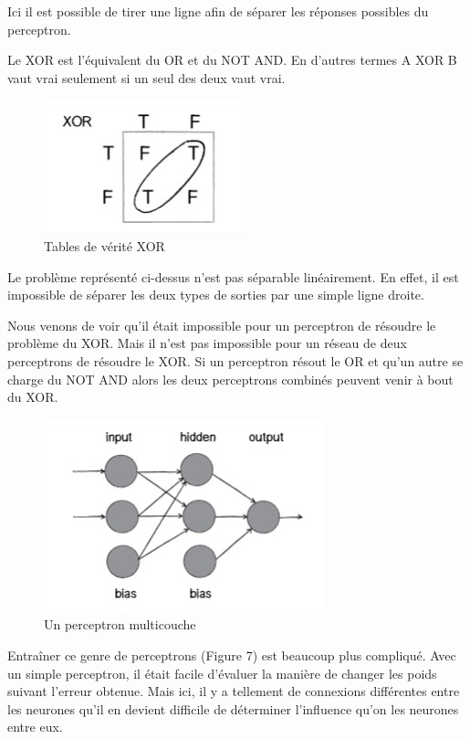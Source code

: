 \documentclass[a4paper, 12pt]{article} %
\begin{document}
Ici il est possible de tirer une ligne afin de séparer les réponses possibles du perceptron.

Le XOR est l’équivalent du OR et du NOT AND. En d’autres termes A XOR B vaut vrai seulement si un seul des deux vaut vrai.

\begin{figure}[!h]%
	\begin{center} 
		\includegraphics[width=0.30\columnwidth]{images/xor.jpg}%
		\caption{Tables de vérité XOR}%
	\end{center}
\end{figure}

Le problème représenté ci-dessus n’est pas séparable linéairement. En effet, il est impossible de séparer les deux types de sorties par une simple ligne droite.

Nous venons de voir qu’il était impossible pour un perceptron de résoudre le problème du XOR. Mais il n’est pas impossible pour un réseau de deux perceptrons de résoudre le XOR. Si un perceptron résout le OR et qu’un autre se charge du NOT AND alors les deux perceptrons combinés peuvent venir à bout du XOR.

\newpage
\begin{figure}[!h]%
	\begin{center} 
		\includegraphics[width=0.60\columnwidth]{images/perceptronmulticouche.jpg}%
		\caption{Un perceptron multicouche}%
	\end{center}
\end{figure}

Entraîner ce genre de perceptrons (Figure 7) est beaucoup plus compliqué. Avec un simple perceptron, il était facile d’évaluer la manière de changer les poids suivant l’erreur obtenue. Mais ici, il y a tellement de connexions différentes entre les neurones qu’il en devient difficile de déterminer l’influence qu’on les neurones entre eux.
\end{document}
